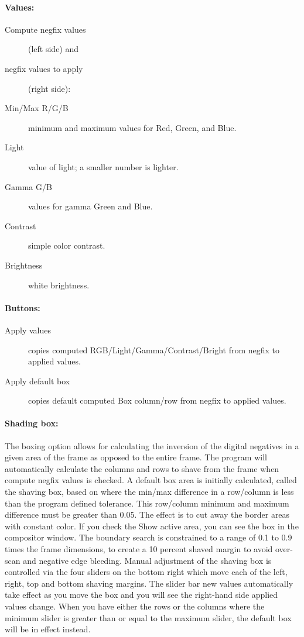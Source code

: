 \paragraph{Values:}
    \begin{description}
        \item[Compute negfix values] (left side) and
        \item[negfix values to apply] (right side):
        \item[Min/Max R/G/B] minimum and maximum values for Red, Green, and Blue.
        \item[Light] value of light; a smaller number is lighter.
        \item[Gamma G/B] values for gamma Green and Blue.
        \item[Contrast] simple color contrast.
        \item[Brightness] white brightness.
    \end{description}
\paragraph{Buttons:}
    \begin{description}
        \item[Apply values] copies computed RGB/Light/Gamma/Contrast/Bright from negfix to applied values.
        \item[Apply default box] copies default computed Box column/row from negfix to applied values.
    \end{description}
\paragraph{Shading box:} The boxing option allows for calculating the inversion of the digital negatives in a given area of the frame as opposed to the entire frame. The program will automatically calculate the columns and rows to shave from the frame when compute negfix values is checked. A default box area is initially calculated, called the shaving box, based on where the min/max difference in a row/column is less than the program defined tolerance. This row/column minimum and maximum difference must be greater than 0.05. The effect is to cut away the border areas with constant color. If you check the Show active area, you can see the box in the compositor window. The boundary search is constrained to a range of 0.1 to 0.9 times the frame dimensions, to create a 10 percent shaved margin to avoid over-scan and negative edge bleeding. Manual adjustment of the shaving box is controlled via the four sliders on the bottom right which move each of the left, right, top and bottom shaving margins. The slider bar new values automatically take effect as you move the box and you will see the right-hand side applied values change. When you have either the rows or the columns where the minimum slider is greater than or equal to the maximum slider, the default box will be in effect instead.

